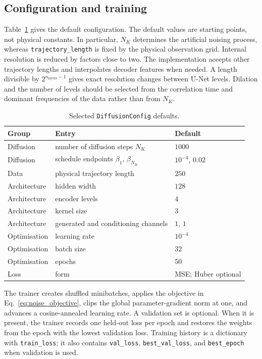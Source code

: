 \subsection{Configuration and training}

Table~\ref{tab:config} gives the default configuration. The default values are
starting points, not physical constants. In particular, $N_K$ determines the
artificial noising process, whereas \texttt{trajectory\_length} is fixed by the
physical observation grid. Internal resolution is reduced by factors close to two.
The implementation accepts other trajectory lengths and interpolates decoder
features when needed. A length divisible by $2^{n_{\mathrm{layers}}-1}$ gives
exact resolution changes between U-Net levels. Dilation and the number of levels
should be selected from the correlation time and dominant frequencies of the data
rather than from $N_K$.

\begin{table}[t]
  \centering
  \caption{Selected \texttt{DiffusionConfig} defaults.}
  \label{tab:config}
  \small
  \begin{tabular}{@{}lll@{}}
    \toprule
    Group & Entry & Default \\
    \midrule
    Diffusion & number of diffusion steps $N_K$ & $1000$ \\
    Diffusion & schedule endpoints $\beta_1$, $\beta_{N_K}$ & $10^{-4}$, $0.02$ \\
    Data & physical trajectory length & $250$ \\
    Architecture & hidden width & $128$ \\
    Architecture & encoder levels & $4$ \\
    Architecture & kernel size & $3$ \\
    Architecture & generated and conditioning channels & $1$, $1$ \\
    Optimisation & learning rate & $10^{-4}$ \\
    Optimisation & batch size & $32$ \\
    Optimisation & epochs & $50$ \\
    Loss & form & MSE; Huber optional \\
    \bottomrule
  \end{tabular}
\end{table}

The trainer creates shuffled minibatches, applies the objective in
Eq.~\eqref{eq:noise_objective}, clips the global parameter-gradient norm at one,
and advances a cosine-annealed learning rate. A validation set is optional. When
it is present, the trainer records one held-out loss per epoch and restores the
weights from the epoch with the lowest validation loss. Training history is a
dictionary with \texttt{train\_loss}; it also contains \texttt{val\_loss},
\texttt{best\_val\_loss}, and \texttt{best\_epoch} when validation is used.

